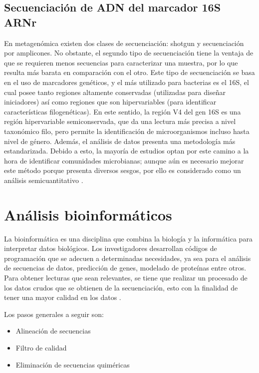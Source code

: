 \documentclass[12pt,letterpaper,oneside]{report}
\begin{document}
\subsection{Secuenciación de ADN del marcador 16S ARNr}
En metagenómica existen dos clases de secuenciación: shotgun y secuenciación por amplicones. No obstante, el segundo tipo de secuenciación tiene la ventaja de que se requieren menos secuencias para caracterizar una muestra, por lo que resulta más barata en comparación con el otro. Este tipo de secuenciación se basa en el uso de marcadores genéticos, y el más utilizado para bacterias es el 16S, el cual posee tanto regiones altamente conservadas (utilizadas para diseñar iniciadores) así como regiones que son hipervariables (para identificar características filogenéticas). En este sentido, la región V4 del gen 16S es una región hipervariable semiconservada, que da una lectura más precisa a nivel taxonómico filo, pero permite la identificación de microorganismos incluso hasta nivel de género. Además, el análisis de datos presenta una metodología más estandarizada. Debido a esto, la mayoría de estudios optan por este camino a la hora de identificar comunidades microbianas; aunque aún es necesario mejorar este método porque presenta diversos sesgos, por ello es considerado como un análisis semicuantitativo \autocite{Ranjan2016,Sanschagrin2014,Yang2016}.
\section{Análisis bioinformáticos}
La bioinformática es una disciplina que combina la biología y la informática para interpretar datos biológicos. Los investigadores desarrollan códigos de programación que se adecuen a determinadas necesidades, ya sea para el análisis de secuencias de datos, predicción de genes, modelado de proteínas entre otros. Para obtener lecturas que sean relevantes, se tiene que realizar un procesado de los datos crudos que se obtienen de la secuenciación, esto con la finalidad de tener una mayor calidad en los datos \autocite{Lesk2019}.
\par
Los pasos generales a seguir son:
\begin{itemize}
\item Alineación de secuencias
\item Filtro de calidad 
\item Eliminación de secuencias quiméricas
\end{itemize}
\end{document}
